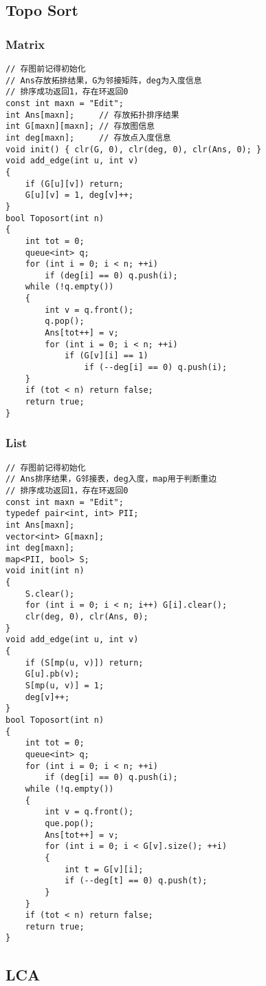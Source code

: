 \documentclass[twoside]{article}
\begin{document}
\subsection{Topo Sort}
\subsubsection{Matrix}
\begin{lstlisting}
// 存图前记得初始化
// Ans存放拓排结果，G为邻接矩阵，deg为入度信息
// 排序成功返回1，存在环返回0
const int maxn = "Edit";
int Ans[maxn];     // 存放拓扑排序结果
int G[maxn][maxn]; // 存放图信息
int deg[maxn];     // 存放点入度信息
void init() { clr(G, 0), clr(deg, 0), clr(Ans, 0); }
void add_edge(int u, int v)
{
    if (G[u][v]) return;
    G[u][v] = 1, deg[v]++;
}
bool Toposort(int n)
{
    int tot = 0;
    queue<int> q;
    for (int i = 0; i < n; ++i)
        if (deg[i] == 0) q.push(i);
    while (!q.empty())
    {
        int v = q.front();
        q.pop();
        Ans[tot++] = v;
        for (int i = 0; i < n; ++i)
            if (G[v][i] == 1)
                if (--deg[i] == 0) q.push(i);
    }
    if (tot < n) return false;
    return true;
}
\end{lstlisting}
\subsubsection{List}
\begin{lstlisting}
// 存图前记得初始化
// Ans排序结果，G邻接表，deg入度，map用于判断重边
// 排序成功返回1，存在环返回0
const int maxn = "Edit";
typedef pair<int, int> PII;
int Ans[maxn];
vector<int> G[maxn];
int deg[maxn];
map<PII, bool> S;
void init(int n)
{
    S.clear();
    for (int i = 0; i < n; i++) G[i].clear();
    clr(deg, 0), clr(Ans, 0);
}
void add_edge(int u, int v)
{
    if (S[mp(u, v)]) return;
    G[u].pb(v);
    S[mp(u, v)] = 1;
    deg[v]++;
}
bool Toposort(int n)
{
    int tot = 0;
    queue<int> q;
    for (int i = 0; i < n; ++i)
        if (deg[i] == 0) q.push(i);
    while (!q.empty())
    {
        int v = q.front();
        que.pop();
        Ans[tot++] = v;
        for (int i = 0; i < G[v].size(); ++i)
        {
            int t = G[v][i];
            if (--deg[t] == 0) q.push(t);
        }
    }
    if (tot < n) return false;
    return true;
}
\end{lstlisting}
\subsection{LCA}
\end{document}
